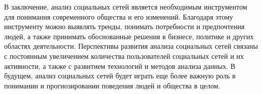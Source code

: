 В заключение, анализ социальных сетей является необходимым инструментом для понимания современного общества и его изменений. Благодаря этому инструменту можно выявлять тренды, понимать потребности и предпочтения людей, а также принимать обоснованные решения в бизнесе, политике и других областях деятельности. Перспективы развития анализа социальных сетей связаны с постоянным увеличением количества пользователей социальных сетей и их активности, а также с развитием технологий и методов анализа данных. В будущем, анализ социальных сетей будет играть еще более важную роль в понимании и прогнозировании поведения людей и общества в целом.